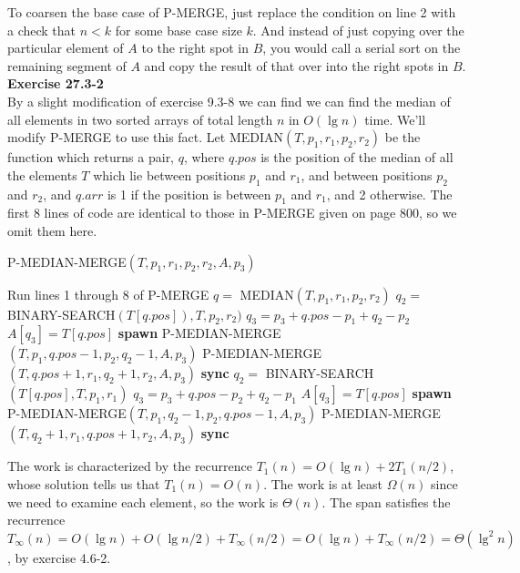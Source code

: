 \documentclass{article}
\begin{document}
To coarsen the base case of P-MERGE, just replace the condition on line 2 with a check that $n<k$ for some base case size $k$. And instead of just copying over the particular element of $A$ to the right spot in $B$,  you would call a serial sort on the remaining segment of $A$ and copy the result of that over into the right spots in $B$.\\

\noindent\textbf{Exercise 27.3-2}\\

By a slight modification of exercise 9.3-8 we can find we can find the median of all elements in two sorted arrays of total length $n$ in $O(\lg n)$ time.  We'll modify P-MERGE to use this fact.  Let MEDIAN$(T,p_1,r_1,p_2,r_2)$ be the function which returns a pair, $q$, where $q.pos$ is the position of the median of all the elements $T$ which lie between positions $p_1$ and $r_1$, and between positions $p_2$ and $r_2$, and $q.arr$ is 1 if the position is between $p_1$ and $r_1$, and 2 otherwise.  The first 8 lines of code are identical to those in P-MERGE given on page 800, so we omit them here.\\

\begin{algorithm}
\caption{P-MEDIAN-MERGE$(T,p_1,r_1,p_2,r_2,A,p_3)$}
\begin{algorithmic}[1]
\State Run lines 1 through 8 of P-MERGE
\State $q =$  MEDIAN$(T,p_1,r_1,p_2,r_2)$
	\State $q_2 = $ BINARY-SEARCH$(T[q.pos]), T, p_2, r_2)$
	\State $q_3 = p_3 + q.pos - p_1 + q_2 - p_2$
	\State $A[q_3] = T[q.pos]$
	\State \textbf{spawn} P-MEDIAN-MERGE$(T, p_1, q.pos - 1, p_2, q_2 - 1, A,p_3)$
	\State P-MEDIAN-MERGE$(T, q.pos + 1, r_1, q_2 + 1, r_2, A,p_3)$
	\State \textbf{sync}
\Else
	\State $q_2 = $ BINARY-SEARCH$(T[q.pos],T,p_1,r_1)$
	\State $q_3 = p_3 + q.pos - p_2 + q_2 - p_1$
	\State $A[q_3] = T[q.pos]$
	\State \textbf{spawn} P-MEDIAN-MERGE$(T, p_1, q_2 - 1, p_2, q.pos - 1, A,p_3)$
	\State P-MEDIAN-MERGE$(T, q_2 + 1, r_1, q.pos + 1, r_2, A,p_3)$
	\State \textbf{sync}
\EndIf
\end{algorithmic}
\end{algorithm}

The work is characterized by the recurrence $T_1(n) = O(\lg n) + 2T_1(n/2)$, whose solution tells us that $T_1(n) = O(n)$.  The work is at least $\Omega(n)$ since we need to examine each element, so the work is $\Theta(n)$.  The span satisfies the recurrence $T_\infty(n) = O(\lg n) + O(\lg n/2) + T_\infty(n/2) = O(\lg n) + T_\infty(n/2) = \Theta(\lg^2 n)$, by exercise 4.6-2. \\  
\end{document}
